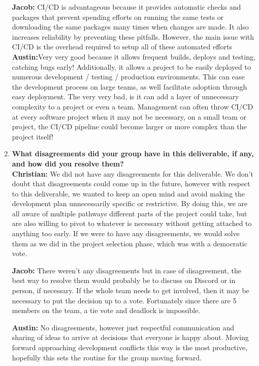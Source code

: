 \documentclass{article}
\begin{document}
\begin{enumerate}
  \textbf{Jacob:}  CI/CD is advantageous because it provides automatic checks and packages that prevent spending efforts on running the same tests or downloading the same packages many times when changes are made. It also increases reliability by preventing these pitfalls. However, the main issue with CI/CD is the overhead required to setup all of these automated efforts\\

  \textbf{Austin:}Very very good because it allows frequent builds, deploys and testing, catching bugs early! Additionally, it allows a project to be easily deployed to numerous development / testing / production environments. This can ease the development process on large teams, as well facilitate adoption through easy deployment. The very very bad, is it can add a layer of unnecessary complexity to a project or even a team. Management can often throw CI/CD at every software project when it may not be necessary, on a small team or project, the CI/CD pipeline could become larger or more complex than the project itself!\\

  \item \textbf{What disagreements did your group have in this deliverable, if any, and how did you resolve them?}\\

  \textbf{Christian:} We did not have any disagreements for this deliverable. We don't doubt that disagreements could come up in the future, however with respect to this deliverable, we wanted to keep an open mind and avoid making the development plan unnecessarily specific or restrictive. By doing this, we are all aware of multiple pathways different parts of the project could take, but are also willing to pivot to whatever is necessary without getting attached to anything too early. If we were to have any disagreements, we would solve them as we did in the project selection phase, which was with a democratic vote.

  \textbf{Jacob:}  There weren’t any disagreements but in case of disagreement, the best way to resolve them would probably be to discuss on Discord or in person, if necessary. If the whole team needs to get involved, then it may be necessary to put the decision up to a vote. Fortunately since there are 5 members on the team, a tie vote and deadlock is impossible.

  \textbf{Austin:} No disagreements, however just respectful communication and sharing of ideas to arrive at decisions that everyone is happy about. Moving forward approaching development conflicts this way is the most productive, hopefully this sets the routine for the group moving forward.

\end{enumerate}
\end{document}
